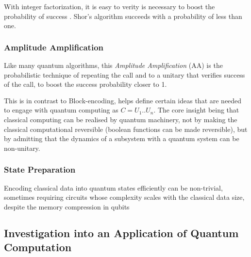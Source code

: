 With integer factorization, it is easy to verity is necessary to boost the probability of success \cite{Lipton:2021}.
Shor's algorithm succeeds with a probability of less than one.


\subsubsection{Amplitude Amplification}

Like many quantum algorithms, this 
\emph{Amplitude Amplification} (AA) \cite{Dalzell:2023} is the probabilistic technique of 
repeating the call and to a unitary that verifies success of the call, to boost the success probability
closer to 1.






This is in contrast to Block-encoding, 
helps define certain ideas that are needed to engage with quantum computing as $C = U_1 .. U_n$. 
The core insight being that classical computing can be realised by quantum machinery, 
not by making the classical computational reversible (boolean functions can be made reversible\cite{Bennett:1989}),
but by admitting that the dynamics of a subsystem with a quantum system can be non-unitary.

\subsubsection{State Preparation}

Encoding classical data into quantum states efficiently can be non-trivial, 
sometimes requiring circuits whose complexity scales with the classical data size, despite the memory compression in qubits


\subsection{Investigation into an Application of Quantum Computation}

